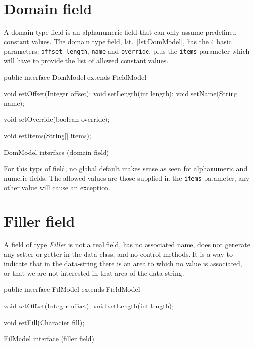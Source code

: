 \section{Domain field}
A domain-type field is an alphanumeric field that can only assume predefined 
constant values. 
The domain type field, lst.~\ref{lst:DomModel}, has the 4 basic parameters: 
\verb!offset!, \verb!length!, \verb!name! and \verb!override!, plus the 
\verb!items! parameter which will have to provide the list of allowed constant 
values.

\begin{elisting}[!htb]
\begin{javacode}
public interface DomModel extends FieldModel {
    void setOffset(Integer offset);
    void setLength(int length);
    void setName(String name);
    
    void setOverride(boolean override);
    
    void setItems(String[] items);
}
\end{javacode}
\caption{DomModel interface (domain field)}
\label{lst:DomModel}
\end{elisting}

For this type of field, no global default makes sense as seen for alphanumeric 
and numeric fields. The allowed values are those supplied in the \verb!items! 
parameter, any other value will cause an exception.

\section{Filler field}
A field of type \textsl{Filler} is not a real field, has no associated name, 
does not generate any setter or getter in the data-class, and no control 
methods. It is a way to indicate that in the data-string there is an area to 
which no value is associated, or that we are not interested in that area of 
the data-string.

\begin{elisting}[!htb]
\begin{javacode}
public interface FilModel extends FieldModel {
    void setOffset(Integer offset);
    void setLength(int length);
    
    void setFill(Character fill);
}
\end{javacode}
\caption{FilModel interface (filler field)}
\label{lst:FilModel}
\end{elisting}

